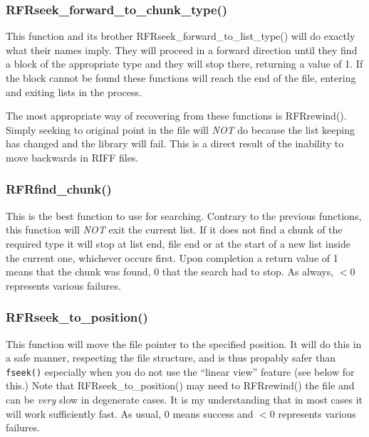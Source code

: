 \documentclass[12pt, a4paper]{article}
\begin{document}
\subsubsection{RFRseek\_forward\_to\_chunk\_type()}
This function and its brother RFRseek\_forward\_to\_list\_type()
will do exactly what their names imply. They will proceed in a forward
direction until they find a block of the appropriate type and they will
stop there, returning a value of 1. If the block cannot be found
these functions will reach the end of the file, entering and exiting
lists in the process. 

The most appropriate way of recovering from these functions is RFRrewind().
Simply seeking to original point in the file will \emph{NOT} do because 
the list keeping has changed and the library will fail. This is a direct
result of the inability to move backwards in RIFF files.

\subsubsection{RFRfind\_chunk()}
This is the best function to use for searching. Contrary to the previous
functions, this function will \emph{NOT} exit
the current list. If it does not find a chunk of the required type it 
will stop at list end, file end or at the
start of a new list inside the current one, whichever occurs first. 
Upon completion a return value of 1 means that the chunk was found, 0
that the search had to stop. As always, $<0$ represents various
failures.

\subsubsection{RFRseek\_to\_position()}
This function will move the file pointer to the specified position. 
It will do this in a safe manner, respecting the file structure, and
is thus propably safer than \verb+fseek()+ especially when you do not
use the ``linear view'' feature (see below for this.)
Note that RFRseek\_to\_position() may need to
RFRrewind() the file and can be \emph{very} slow in degenerate cases. 
It is my understanding that in most cases it will work sufficiently
fast. 
As usual,
0 means success and $<0$ represents various failures.
\end{document}
